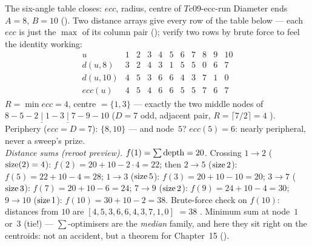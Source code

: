 \begin{example}{The six-angle table closes: $\mathit{ecc}$, radius, centre of $T$}{c09-ecc-run}
Diameter ends $A = 8$, $B = 10$ (). Two distance arrays give every
row of the table below --- each $\mathit{ecc}$ is just the $\max$ of its column pair
(); verify two rows by brute force to feel the identity working:
\[
\begin{array}{c|cccccccccc}
u                & 1 & 2 & 3 & 4 & 5 & 6 & 7 & 8 & 9 & 10 \\ \hline
d(u, 8)          & 3 & 2 & 4 & 3 & 1 & 5 & 5 & 0 & 6 & 7 \\
d(u, 10)         & 4 & 5 & 3 & 6 & 6 & 4 & 3 & 7 & 1 & 0 \\
\mathit{ecc}(u) & 4 & 5 & 4 & 6 & 6 & 5 & 5 & 7 & 6 & 7
\end{array}
\]
$R = \min \mathit{ecc} = 4$, centre $= \{1, 3\}$ --- exactly the two middle nodes of
$8\!-\!5\!-\!2\!\underline{\mid}\!1\!-\!3\!\underline{\mid}\!7\!-\!9\!-\!10$
($D = 7$ odd, adjacent pair, $R = \lceil 7/2 \rceil = 4$ ).
Periphery ($\mathit{ecc} = D = 7$): $\{8, 10\}$ --- and node~$5$? $\mathit{ecc}(5)=6$:
nearly peripheral, never a sweep's prize.\\
\emph{Distance sums (reroot preview).} $f(1) = \sum \operatorname{depth} = 20$. Crossing $1 \to 2$
($\operatorname{size}(2)=4$): $f(2) = 20 + 10 - 2{\cdot}4 = 22$; then $2 \to 5$ ($\operatorname{size} 2$):
$f(5) = 22 + 10 - 4 = 28$; $1 \to 3$ ($\operatorname{size} 5$): $f(3) = 20 + 10 - 10 = 20$;
$3 \to 7$ ($\operatorname{size} 3$): $f(7) = 20 + 10 - 6 = 24$; $7 \to 9$ ($\operatorname{size} 2$):
$f(9) = 24 + 10 - 4 = 30$; $9 \to 10$ ($\operatorname{size} 1$): $f(10) = 30 + 10 - 2 = 38$.
Brute-force check on $f(10)$: distances from $10$ are
$[4,5,3,6,6,4,3,7,1,0]$ $= 38$ \checkmark. Minimum sum at node~$1$ or~$3$ (tie!) ---
$\sum$-optimisers are the \emph{median} family, and here they sit right on the
centroids: not an accident, but a theorem for Chapter~15 (). \end{example}

